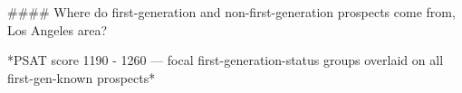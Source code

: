 #### Where do first-generation and non-first-generation prospects come from, Los Angeles area?

*PSAT score 1190 - 1260 — focal first-generation-status groups overlaid on all first-gen-known prospects*
